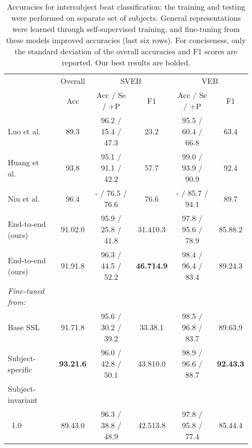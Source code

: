 \documentclass{article}
\newcommand{\std}[1]{{\scriptsize{#1}}}
\begin{document}
\begin{table}[H]
  \caption{Accuracies for intersubject beat classification: the training and
  testing were performed on separate set of subjects. General representations
  were learned through self-supervised training, and fine-tuning from these
  models improved accuracies (last six rows). For conciseness, only the standard
  deviation of the overall accuracies and F1 scores are reported. Our best
  results are bolded.}
  \label{table:ecg:beat:fine}
  \centering
  \begin{tabular}{lccccc}
    \toprule
    & \multicolumn{1}{c}{Overall}
    & \multicolumn{2}{c}{SVEB}
    & \multicolumn{2}{c}{VEB} \\
    \cmidrule(lr){2-2}\cmidrule(lr){3-4}\cmidrule(lr){5-6}
    & Acc & Acc / Se / +P & F1 & Acc / Se / +P & F1 \\
    \hline
Luo et al.~\cite{luo_patient-specific_2017} & 89.3
    & 96.2 / 15.4 / 47.3 & 23.2 & 95.5 / 60.4 / 66.8 & 63.4 \\
Huang et al.~\cite{huang_new_2014} & 93.8
    & 95.1 / 91.1 / 42.2 & 57.7 & 99.0 / 93.9 / 90.9 & 92.4\\
Niu et al.~\cite{niu_inter-patient_2019} & 96.4
    & - / 76.5 / 76.6 & 76.6 & - / 85.7 / 94.1 & 89.7 \\
\hline
End-to-end (ours)
    & 91.0\std{2.0}
    & 95.9 / 25.8 / 41.8 & 31.4\std{10.3}
    & 97.8 / 95.6 / 78.9 & 85.8\std{8.2}\\

End-to-end (ours)
    & 91.9\std{1.8}
    & 96.3 / 44.5 / 52.2 & \textbf{46.7\std{14.9}}
    & 98.4 / 96.4 / 83.4 & 89.2\std{4.3} \\

    \hline
    \textit{Fine-tuned from:}\\
\hspace{10pt}Base SSL
    & 91.7\std{1.8}
    & 95.6 / 30.2 / 39.2 & 33.3\std{8.1}
    & 98.5 / 96.8 / 83.7 & 89.6\std{3.9} \\

\hspace{10pt}Subject-specific
    & \textbf{93.2\std{1.6}}
    & 96.0 / 42.8 / 50.1 & 43.8\std{10.0}
    & 98.9 / 96.6 / 88.7 & \textbf{92.4\std{3.3}} \\

    \hspace{10pt}Subject-invariant\\
\hspace{15pt}~1.0
    & 89.4\std{3.0}
    & 96.3 / 38.8 / 48.9 & 42.5\std{13.8}
    & 97.8 / 95.8 / 77.4 & 85.4\std{4.4} \\


\end{tabular}
\end{table}
\end{document}
